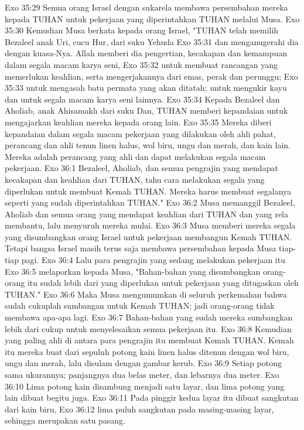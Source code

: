 Exo 35:29  Semua orang Israel dengan sukarela membawa persembahan mereka kepada TUHAN untuk pekerjaan yang diperintahkan TUHAN melalui Musa.
Exo 35:30  Kemudian Musa berkata kepada orang Israel, "TUHAN telah memilih Bezaleel anak Uri, cucu Hur, dari suku Yehuda
Exo 35:31  dan menganugerahi dia dengan kuasa-Nya. Allah memberi dia pengertian, kecakapan dan kemampuan dalam segala macam karya seni,
Exo 35:32  untuk membuat rancangan yang memerlukan keahlian, serta mengerjakannya dari emas, perak dan perunggu;
Exo 35:33  untuk mengasah batu permata yang akan ditatah; untuk mengukir kayu dan untuk segala macam karya seni lainnya.
Exo 35:34  Kepada Bezaleel dan Aholiab, anak Ahisamakh dari suku Dan, TUHAN memberi kepandaian untuk mengajarkan keahlian mereka kepada orang lain.
Exo 35:35  Mereka diberi kepandaian dalam segala macam pekerjaan yang dilakukan oleh ahli pahat, perancang dan ahli tenun linen halus, wol biru, ungu dan merah, dan kain lain. Mereka adalah perancang yang ahli dan dapat melakukan segala macam pekerjaan.
Exo 36:1  Bezaleel, Aholiab, dan semua pengrajin yang mendapat kecakapan dan keahlian dari TUHAN, tahu cara melakukan segala yang diperlukan untuk membuat Kemah TUHAN. Mereka harus membuat segalanya seperti yang sudah diperintahkan TUHAN."
Exo 36:2  Musa memanggil Bezaleel, Aholiab dan semua orang yang mendapat keahlian dari TUHAN dan yang rela membantu, lalu menyuruh mereka mulai.
Exo 36:3  Musa memberi mereka segala yang disumbangkan orang Israel untuk pekerjaan membangun Kemah TUHAN. Tetapi bangsa Israel masih terus saja membawa persembahan kepada Musa tiap-tiap pagi.
Exo 36:4  Lalu para pengrajin yang sedang melakukan pekerjaan itu
Exo 36:5  melaporkan kepada Musa, "Bahan-bahan yang disumbangkan orang-orang itu sudah lebih dari yang diperlukan untuk pekerjaan yang ditugaskan oleh TUHAN."
Exo 36:6  Maka Musa mengumumkan di seluruh perkemahan bahwa sudah cukuplah sumbangan untuk Kemah TUHAN; jadi orang-orang tidak membawa apa-apa lagi.
Exo 36:7  Bahan-bahan yang sudah mereka sumbangkan lebih dari cukup untuk menyelesaikan semua pekerjaan itu.
Exo 36:8  Kemudian yang paling ahli di antara para pengrajin itu membuat Kemah TUHAN. Kemah itu mereka buat dari sepuluh potong kain linen halus ditenun dengan wol biru, ungu dan merah, lalu disulam dengan gambar kerub.
Exo 36:9  Setiap potong sama ukurannya; panjangnya dua belas meter, dan lebarnya dua meter.
Exo 36:10  Lima potong kain disambung menjadi satu layar, dan lima potong yang lain dibuat begitu juga.
Exo 36:11  Pada pinggir kedua layar itu dibuat sangkutan dari kain biru,
Exo 36:12  lima puluh sangkutan pada masing-masing layar, sehingga merupakan satu pasang.
